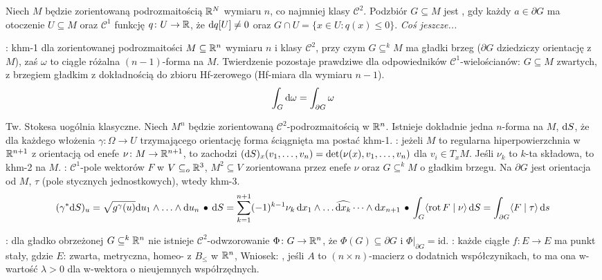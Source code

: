 Niech  $M$ będzie zorientowaną podrozmaitością $\mathbb{R}^N$ wymiaru $n$, co najmniej klasy $\mathscr C^2$.
Podzbiór $G \subseteq M$ jest , gdy każdy $a \in \partial G$ ma otoczenie $U \subseteq M$ oraz $\mathscr C^1$ funkcję $q \colon U \to \mathbb{R}$, że $\textrm{d} q[U] \neq 0$ oraz $G \cap U = \{x \in U : q(x) \le 0\}$.
\emph{Coś jeszcze...}

:  khm-1 dla zorientowanej podrozmaitości $M \subseteq \mathbb{R}^n$ wymiaru $n$ i klasy $\mathscr C^2$, przy czym $G \subseteq^k M$ ma gładki brzeg ($\partial G$ dziedziczy orientację z $M$), zaś $\omega$ to ciągle różalna $(n-1)$-forma na $M$.
Twierdzenie pozostaje prawdziwe dla odpowiedników $\mathscr C^1$-wielościanów: $G \subseteq M$ zwartych, z brzegiem gładkim z dokładnością do zbioru Hf-zerowego (Hf-miara dla wymiaru $n-1$).
\[
	\int_G \textrm{d} \omega = \int_{\partial G} \omega
\]

Tw.  Stokesa uogólnia klasyczne.
Niech $M^n$ będzie zorientowaną $\mathscr C^2$-podrozmaitością w $\mathbb{R}^n$.
Istnieje dokładnie jedna $n$-forma na $M$, $\textrm{d} S$, że dla każdego włożenia $\gamma \colon \Omega \to U$ trzymającego orientację forma ściągnięta ma postać khm-1.
: jeżeli $M$ to regularna hiperpowierzchnia w $\mathbb{R}^{n+1}$ z orientacją od enefe $\nu \colon M \to \mathbb{R}^{n+1}$, to zachodzi $(\textrm{d} S)_x(v_1, \ldots, v_n) = \det (\nu(x), v_1, \ldots, v_n)$ dla $v_i \in T_xM$.
Jeśli $\nu_k$ to $k$-ta składowa, to khm-2 na $M$.
: $\mathscr C^1$-pole wektorów $F$ w $V \subseteq_o \mathbb{R}^3$, $M^2 \subseteq V$ zorientowana przez enefe $\nu$ oraz $G \subseteq^k M$ o gładkim brzegu.
Na $\partial G$ jest orientacja od $M$, $\tau$ (pole stycznych jednostkowych), wtedy khm-3.
\[
	(\gamma^* \textrm{d} S)_u = \sqrt{g^\gamma (u)} \textrm{d} u_1 \wedge \ldots \wedge \textrm{d} u_n \, \bullet \,
	\textrm{d}{S} = \sum_{k=1}^{n+1} (-1)^{k-1} \nu_k \,\textrm{d}{x_1} \wedge \dots \widehat{\textrm{d}{x_k}} \dots \wedge \textrm{d}{x_{n+1}} \, \bullet \,
	\int_G \langle \operatorname{rot} F \mid \nu \rangle \,\textrm{d} S = \int_{\partial G} \langle F \mid \tau \rangle \,\textrm{d} s
\]

: dla  gładko obrzeżonej  $G \subseteq^k \mathbb{R}^n$ nie istnieje $\mathscr C^2$-odwzorowanie $\Phi \colon G \to \mathbb{R}^n$, że $\Phi(G) \subseteq \partial G$ i $\Phi |_{\partial G} = \text{id}$.
: każde ciągłe $f  \colon E \to E$ ma punkt stały, gdzie $E$: zwarta, metryczna, homeo- z $B_\le$ w $\mathbb{R}^n$,
Wniosek: , jeśli $A$ to $(n \times n)$-macierz o dodatnich współczynikach, to ma ona w-wartość $\lambda > 0$ dla w-wektora o nieujemnych współrzędnych.